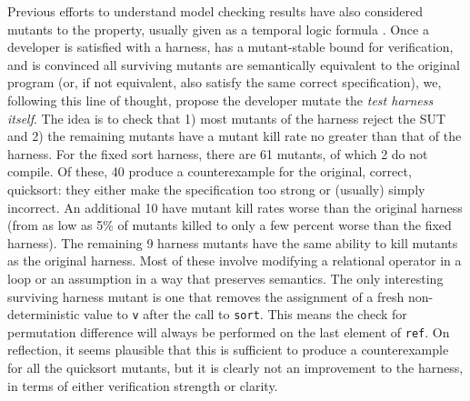 \documentclass{svjour3}
\begin{document}
Previous efforts to understand model checking results have also
considered mutants to the property, usually given as a temporal logic
formula \cite{MutSpec}.  Once a developer is satisfied with a harness,
has a mutant-stable bound for verification, and is convinced all
surviving mutants are semantically equivalent to the original program
(or, if not equivalent, also satisfy the same correct specification),
we, following this line of thought, propose the developer mutate the \emph{test harness itself}.  The
idea is to check that 1) most mutants of the harness reject the SUT
and 2) the remaining mutants have a mutant kill rate no greater than
that of the harness.  For the fixed sort harness, there are 61 mutants, of
which 2 do not compile.  Of these, 40 produce a
counterexample for the original, correct, quicksort:  they either make
the specification too strong or (usually) simply incorrect.  An additional
10 have mutant kill rates worse than the original harness (from
as low as 5\% of mutants killed to only a few percent worse than the
fixed harness).  The remaining 9 harness mutants have the same ability to kill
mutants as the original harness.  Most of these involve modifying a
relational operator in a loop or an assumption in a way that preserves
semantics.  The only interesting surviving
harness mutant is one that removes the assignment of a fresh
non-deterministic value to {\tt v} after the call to {\tt sort}.  This
means the check for permutation difference will always be performed on
the last element of {\tt ref}.  On reflection, it seems plausible
that this is sufficient to produce a counterexample for all the quicksort mutants, but it is clearly not an improvement to the harness, in
terms of either verification strength or clarity.
\end{document}
